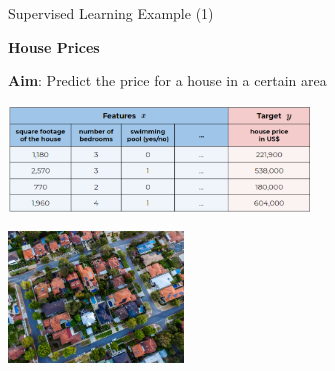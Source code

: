 \documentclass[11pt,compress,t,notes=noshow, xcolor=table]{beamer}
\begin{document}
\begin{vbframe}{Supervised Learning Example (1)}


  \textbf{House Prices}
  
  
    \textbf{Aim}: Predict the price for a house in a certain area
    
    \lz
    
    \begin{center}
    \includegraphics[width=0.6\textwidth]{figure_man/ml-basics-supervised-task-houses-data.png} 
    
    \lz
    
    \includegraphics[width=0.35\textwidth]{figure_man/ml-basics-supervised-task-houses-pic.jpg} 
    
    \end{center}
    

\end{vbframe}

\end{document}
